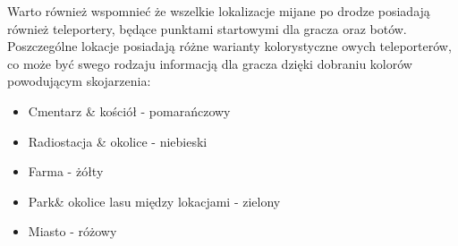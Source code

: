 Warto również wspomnieć że wszelkie lokalizacje mijane po drodze posiadają również teleportery, będące punktami startowymi dla gracza oraz botów. Poszczególne lokacje posiadają różne warianty kolorystyczne owych teleporterów, co może być swego rodzaju informacją dla gracza dzięki dobraniu kolorów powodującym skojarzenia:
\begin{itemize}
    \item Cmentarz \& kościół - pomarańczowy
    \item Radiostacja \& okolice - niebieski
    \item Farma - żółty
    \item Park\& okolice lasu między lokacjami - zielony
    \item Miasto - różowy
\end{itemize}